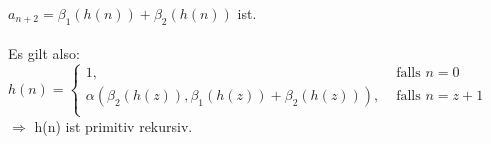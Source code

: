 \documentclass[a4paper]{scrartcl}%
\begin{document}
\begin{itemize}
            $a_{n+2}=\beta_1(h(n)) + \beta_2(h(n))$ ist.\\
            \\Es gilt also:\\
            $h(n) = 
            \begin{cases}
                1, &\text{ falls }n=0\\
                \alpha(\beta_2(h(z)), \beta_1(h(z)) + \beta_2(h(z))), &\text{ falls }n=z+1\\
            \end{cases}$\\
            $\Rightarrow$ h(n) ist primitiv rekursiv.\\
    \end{itemize}
    
\end{document}
